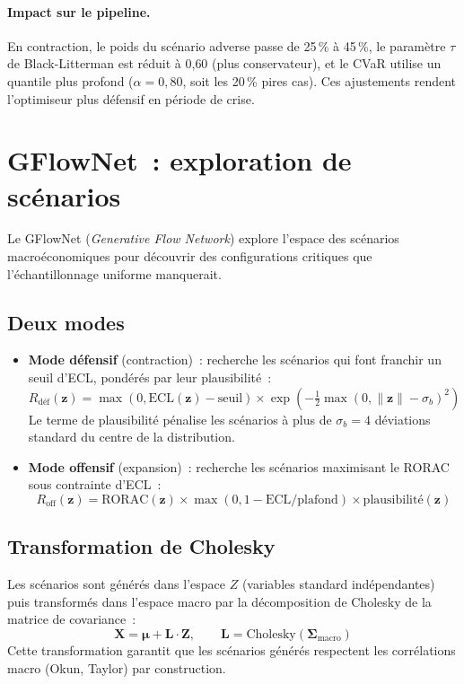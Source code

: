 \documentclass[12pt, a4paper, twoside, openright]{report}
\theoremstyle{definition}
\begin{document}
\paragraph{Impact sur le pipeline.} En contraction, le poids du scénario adverse passe de 25\,\% à 45\,\%, le paramètre $\tau$ de Black-Litterman est réduit à 0{,}60 (plus conservateur), et le CVaR utilise un quantile plus profond ($\alpha = 0{,}80$, soit les 20\,\% pires cas). Ces ajustements rendent l'optimiseur plus défensif en période de crise.

\section{GFlowNet~: exploration de scénarios}
\label{sec:gouv:gflownet}

Le GFlowNet (\emph{Generative Flow Network}) explore l'espace des scénarios macroéconomiques pour découvrir des configurations critiques que l'échantillonnage uniforme manquerait.

\subsection{Deux modes}

\begin{itemize}
  \item \textbf{Mode défensif} (contraction)~: recherche les scénarios qui font franchir un seuil d'ECL, pondérés par leur plausibilité~:
  $$R_{\text{déf}}(\mathbf{z}) = \max(0, \text{ECL}(\mathbf{z}) - \text{seuil}) \times \exp\!\left(-\tfrac{1}{2}\max(0, \|\mathbf{z}\| - \sigma_b)^2\right)$$
  Le terme de plausibilité pénalise les scénarios à plus de $\sigma_b = 4$ déviations standard du centre de la distribution.

  \item \textbf{Mode offensif} (expansion)~: recherche les scénarios maximisant le RORAC sous contrainte d'ECL~:
  $$R_{\text{off}}(\mathbf{z}) = \text{RORAC}(\mathbf{z}) \times \max(0, 1 - \text{ECL}/\text{plafond}) \times \text{plausibilité}(\mathbf{z})$$
\end{itemize}

\subsection{Transformation de Cholesky}

Les scénarios sont générés dans l'espace $Z$ (variables standard indépendantes) puis transformés dans l'espace macro par la décomposition de Cholesky de la matrice de covariance~:
$$\mathbf{X} = \boldsymbol{\mu} + \mathbf{L} \cdot \mathbf{Z}, \qquad \mathbf{L} = \text{Cholesky}(\boldsymbol{\Sigma}_{\text{macro}})$$
Cette transformation garantit que les scénarios générés respectent les corrélations macro (Okun, Taylor) par construction.
\end{document}

